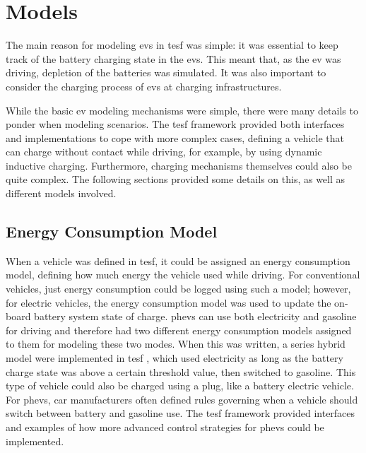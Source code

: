 \section{Models}
The main reason for modeling \glspl{ev} in \gls{tesf} was simple: it was essential to keep track of the battery charging state in the \glspl{ev}. This meant that, as the \gls{ev} was driving, depletion of the batteries was simulated. It was also important to consider the charging process of \glspl{ev} at charging infrastructures.

While the basic \gls{ev} modeling mechanisms were simple, there were many details to ponder when modeling scenarios. 
The \gls{tesf} framework provided both interfaces and implementations to cope with more complex cases, \eg defining a vehicle that can charge without contact while driving,
for example, by using dynamic inductive charging. Furthermore, charging mechanisms themselves could also be quite complex. The following sections provided some details on this, as well as different models involved.

\subsection{Energy Consumption Model}
When a vehicle was defined in \gls{tesf}, it could be assigned an energy consumption model, defining how much energy the vehicle used while driving. For conventional vehicles, just energy consumption could be logged using such a model; however, for electric vehicles, the energy consumption model was used to update the on-board battery system state of charge. \glspl{phev} can use both electricity and gasoline for driving and therefore had two different energy consumption models assigned to them for modeling these two modes. When this was written, a series hybrid model were implemented in \gls{tesf} \citep[][]{Chan_PIEEE_2007}, which used electricity as long as the battery charge state was above a certain threshold value, then switched to gasoline. This type of vehicle could also be charged using a plug, like a battery electric vehicle. For \glspl{phev}, car manufacturers often defined rules governing when a vehicle should switch between battery and gasoline use. The \gls{tesf} framework provided interfaces and examples of how more advanced control strategies for \glspl{phev} could be implemented.

